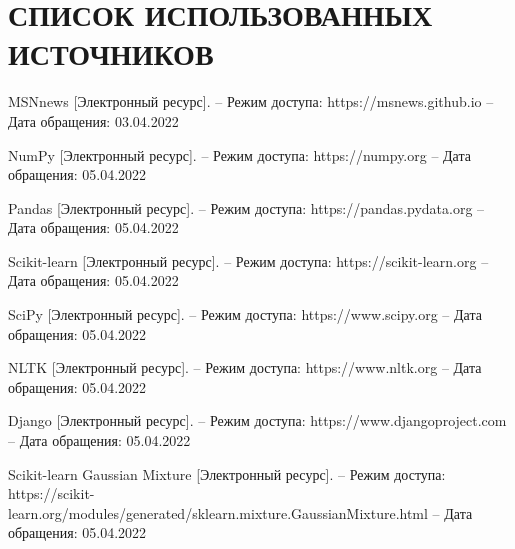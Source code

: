 \section*{СПИСОК ИСПОЛЬЗОВАННЫХ ИСТОЧНИКОВ}

\begingroup
\renewcommand{\section}[2]{}
\begin{thebibliography}{}
	
	
	MSNnews [Электронный ресурс]. – Режим доступа: https://msnews.github.io – Дата
	обращения: 03.04.2022
	
	
	NumPy [Электронный ресурс]. – Режим доступа: https://numpy.org – Дата
	обращения: 05.04.2022
	
	
	Pandas [Электронный ресурс]. – Режим доступа:
	https://pandas.pydata.org – Дата обращения: 05.04.2022
	
	
	Scikit-learn [Электронный ресурс]. – Режим доступа:
	https://scikit-learn.org – Дата обращения: 05.04.2022
	
	
	SciPy [Электронный ресурс]. – Режим доступа: https://www.scipy.org –
	Дата обращения: 05.04.2022
	
	
	NLTK [Электронный ресурс]. – Режим доступа:
	https://www.nltk.org – Дата обращения: 05.04.2022
	
	
	Django [Электронный ресурс]. – Режим доступа:
	https://www.djangoproject.com – Дата обращения: 05.04.2022
	
	
	Scikit-learn Gaussian Mixture [Электронный ресурс]. – Режим доступа:
	https://scikit-learn.org/modules/generated/sklearn.mixture.GaussianMixture.html – Дата обращения: 05.04.2022
	
	
\end{thebibliography}
\endgroup
